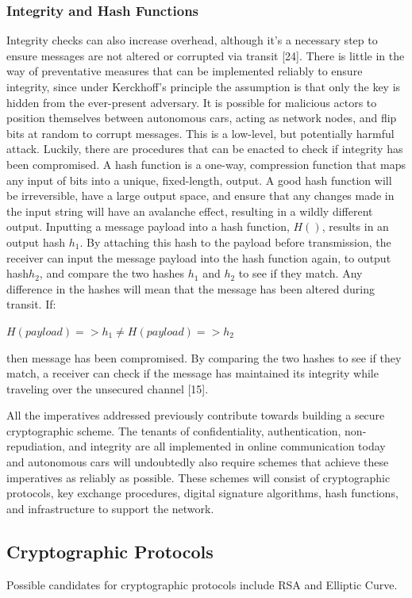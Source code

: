 \documentclass[conference,compsoc]{IEEEtran}
\begin{document}
\subsubsection{Integrity and Hash Functions}
Integrity checks can also increase overhead, although it’s a necessary step to ensure messages are not altered or corrupted via transit [24]. There is little in the way of preventative measures that can be implemented reliably to ensure integrity, since under Kerckhoff's principle the assumption is that only the key is hidden from the ever-present adversary. It is possible for malicious actors to position themselves between autonomous cars, acting as network nodes, and flip bits at random to corrupt messages. This is a low-level, but potentially harmful attack. Luckily, there are procedures that can be enacted to check if integrity has been compromised. A hash function is a one-way, compression function that maps any input of bits into a unique, fixed-length, output. A good hash function will be irreversible, have a large output space, and ensure that any changes made in the input string will have an avalanche effect, resulting in a wildly different output. Inputting a message payload into a hash function, $H()$, results in an output hash $h_1$. By attaching this hash to the payload before transmission, the receiver can input the message payload into the hash function again, to output hash$h_2$, and compare the two hashes $h_1$ and $h_2$ to see if they match. Any difference in the hashes will mean that the message has been altered during transit. If:\\
\begin{center}
\large $H(payload) => h_1 \neq H(payload) => h_2$
\break
\end{center}
then message has been compromised. By comparing the two hashes to see if they match, a receiver can check if the message has maintained its integrity while traveling over the unsecured channel [15]. 

All the imperatives addressed previously contribute towards building a secure cryptographic scheme. The tenants of confidentiality, authentication, non-repudiation, and integrity are all implemented in online communication today and autonomous cars will undoubtedly also require schemes that achieve these imperatives as reliably as possible. These schemes will consist of cryptographic protocols, key exchange procedures, digital signature algorithms, hash functions, and infrastructure to support the network. 

\subsection{Cryptographic Protocols}
Possible candidates for cryptographic protocols include RSA and Elliptic Curve.
\end{document}
